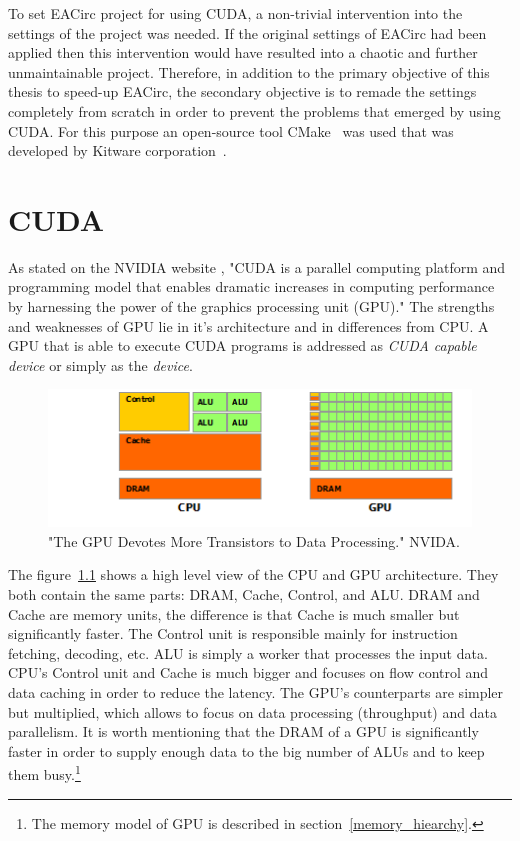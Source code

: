 \documentclass[12pt,oneside]{fithesis2}
\begin{document}
\bigskip

To set EACirc project for using CUDA, a non-trivial intervention into the settings of the project was needed. If the original settings of EACirc had been applied then this intervention would have resulted into a chaotic and further unmaintainable project. Therefore, in addition to the primary objective of this thesis to speed-up EACirc, the secondary objective is to remade the settings completely from scratch in order to prevent the problems that emerged by using CUDA. For this purpose an open-source tool CMake~\cite{cmake} was used that was developed by Kitware corporation~\cite{kitware}.





\chapter{CUDA}
As stated on the NVIDIA website \cite{about_cuda}, "CUDA is a parallel computing platform and programming model that enables dramatic increases in computing performance by harnessing the power of the graphics processing unit (GPU)." The strengths and weaknesses of GPU lie in it's architecture and in differences from CPU. A GPU that is able to execute CUDA programs is addressed as \emph{CUDA capable device} or simply as the \emph{device}.

\begin{figure}[H]
	\centering
	\includegraphics{figures/gpu-devotes-more-transistors-to-data-processing.png}
	\caption{"The GPU Devotes More Transistors to Data Processing." NVIDA. \cite{cuda_guide}}
	\label{fig:cpu_vs_gpu_arch}
\end{figure}

The figure~\ref{fig:cpu_vs_gpu_arch} shows a high level view of the CPU and GPU architecture. They both contain the same parts: DRAM, Cache, Control, and ALU. DRAM and Cache are memory units, the difference is that Cache is much smaller but significantly faster. The Control unit is responsible mainly for instruction fetching, decoding, etc. ALU is simply a worker that processes the input data. CPU's Control unit and Cache is much bigger and focuses on flow control and data caching in order to reduce the latency. The GPU's counterparts are simpler but multiplied, which allows to focus on data processing (throughput) and data parallelism. It is worth mentioning that the DRAM of a GPU is significantly faster in order to supply enough data to the big number of ALUs and to keep them busy.\footnote{The memory model of GPU is described in section~\ref{memory_hiearchy}.}
\end{document}

